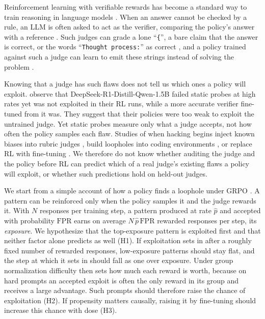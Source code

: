 \documentclass[11pt]{article}
\newcommand{\fpr}{\mathrm{FPR}}
\newcommand{\phat}{\hat{p}}
\newcommand{\str}[1]{``\texttt{#1}''}
\begin{document}
Reinforcement learning with verifiable rewards has become a standard way to train reasoning in language models
\citep{shao2024deepseekmath, deepseek2025r1}. When an answer cannot be checked by a rule, an LLM is often asked to
act as the verifier, comparing the policy's answer with a reference \citep{chen2025xverify, ma2025generalreasoner}.
Such judges can grade a lone \str{\{}, a bare claim that the answer is correct, or
the words \str{Thought process:} as correct \citep{huang2025accuracy, zhao2025onetoken}, and a policy trained
against such a judge can learn to emit these strings instead of solving the problem
\citep{huang2025accuracy}.

Knowing that a judge has such flaws does not tell us which ones a policy will exploit. \citet{huang2025accuracy}
observe that DeepSeek-R1-Distill-Qwen-1.5B failed static probes at high rates yet was not exploited in their RL runs,
while a more accurate verifier fine-tuned from it was. They suggest that their policies were too weak to exploit the
untrained judge. Yet static probes measure only what a judge accepts, not how often the policy samples each flaw. Studies of when hacking begins inject known biases into rubric judges \citep{wang2026rubric}, build loopholes into coding environments
\citep{khalifa2026countdown, wang2026catch}, or replace RL with fine-tuning \citep{eleutherai2026indicators}.
We therefore do not know whether auditing the judge and the policy before RL can predict which of a real judge's
existing flaws a policy will exploit, or whether such predictions hold on held-out judges.

We start from a simple account of how a policy finds a loophole under GRPO \citep{shao2024deepseekmath}. A pattern
can be reinforced only when the policy samples it and the judge rewards it. With $N$ responses per training step,
a pattern produced at rate $\phat$ and accepted with probability $\fpr$ earns on average $N\,\phat\,\fpr$ rewarded
responses per step, its \emph{exposure}. We hypothesize that the top-exposure pattern is exploited first and that
neither factor alone predicts as well (H1). If exploitation sets in after a roughly fixed number of rewarded
responses, low-exposure patterns should stay flat, and the step at which it sets in should fall as one over exposure. Under group normalization difficulty then sets how much each
reward is worth, because on hard prompts an accepted exploit is often the only reward in its group and receives a large advantage.
Such prompts should therefore raise the chance of exploitation (H2). If propensity matters causally, raising it by
fine-tuning should increase this chance with dose (H3).
\end{document}
